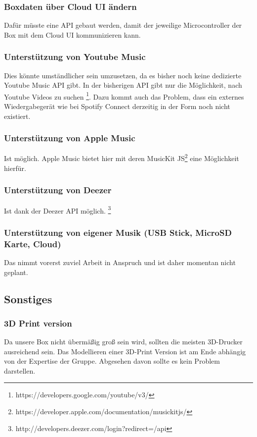 \documentclass[10pt, a4paper, draft]{article}
\begin{document}
\subsubsection{Boxdaten über Cloud UI ändern}
Dafür müsste eine API gebaut werden, damit der jeweilige Microcontroller der Box mit dem Cloud UI kommunizieren kann.

\subsubsection{Unterstützung von Youtube Music}
Dies könnte umständlicher sein umzusetzen, da es bisher noch keine dedizierte Youtube Music API gibt. In der bisherigen API gibt nur die Möglichkeit, nach Youtube Videos zu suchen \footnote{https://developers.google.com/youtube/v3/}. Dazu kommt auch das Problem, dass ein externes Wiedergabegerät wie bei Spotify Connect derzeitig in der Form noch nicht existiert.
\subsubsection{Unterstützung von Apple Music}
Ist möglich. Apple Music bietet hier mit deren MusicKit JS\footnote{https://developer.apple.com/documentation/musickitjs/} eine Möglichkeit hierfür.
\subsubsection{Unterstützung von Deezer}
Ist dank der Deezer API möglich. \footnote{http://developers.deezer.com/login?redirect=/api}
\subsubsection{Unterstützung von eigener Musik (USB Stick, MicroSD Karte, Cloud)}
Das nimmt vorerst zuviel Arbeit in Anspruch und ist daher momentan nicht geplant.

\subsection{Sonstiges}
\subsubsection{3D Print version}
Da unsere Box nicht übermäßig groß sein wird, sollten die meisten 3D-Drucker ausreichend sein. Das Modellieren einer 3D-Print Version ist am Ende abhängig von der Expertise der Gruppe. Abgesehen davon sollte es kein Problem darstellen.
\end{document}
